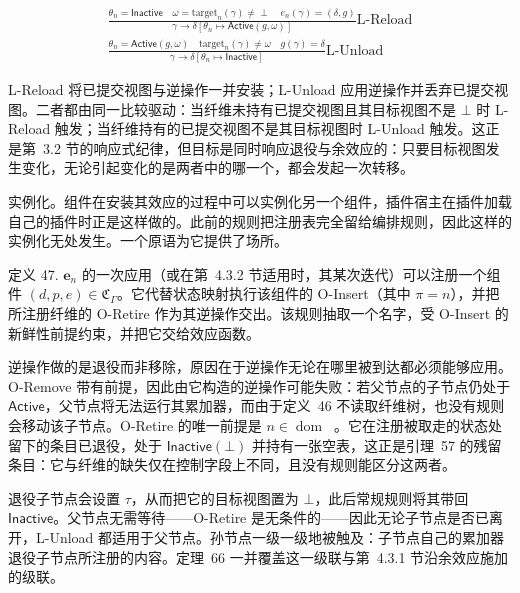 \[
\begin{array} { r }
{ \frac { \theta _ { n } = \mathsf { I n a c t i v e } \quad \omega = \mathrm { t a r g e t } _ { n } ( \gamma ) \neq \perp \quad e _ { n } ( \gamma ) = ( \delta , g ) } { \gamma \longrightarrow \delta [ \theta _ { n } \mapsto \mathsf { A c t i v e } ( g , \omega ) ] } \mathrm { L } \text {-Reload} } \\
{ \frac { \theta _ { n } = \mathsf { A c t i v e } ( g , \omega ) \quad \mathrm { t a r g e t } _ { n } ( \gamma ) \neq \omega \quad g ( \gamma ) = \delta } { \gamma \longrightarrow \delta [ \theta _ { n } \mapsto \mathsf { I n a c t i v e } ] } \mathrm { L } \text {-Unload} }
\end{array}
\]

L-Reload 将已提交视图与逆操作一并安装；L-Unload 应用逆操作并丢弃已提交视图。二者都由同一比较驱动：当纤维未持有已提交视图且其目标视图不是 $\bot$ 时 L-Reload 触发；当纤维持有的已提交视图不是其目标视图时 L-Unload 触发。这正是第~3.2 节的响应式纪律，但目标是同时响应退役与余效应的：只要目标视图发生变化，无论引起变化的是两者中的哪一个，都会发起一次转移。

实例化。组件在安装其效应的过程中可以实例化另一个组件，插件宿主在插件加载自己的插件时正是这样做的。此前的规则把注册表完全留给编排规则，因此这样的实例化无处发生。一个原语为它提供了场所。

定义 47. \(\boldsymbol { e } _ { n }\) 的一次应用（或在第~4.3.2 节适用时，其某次迭代）可以注册一个组件 \(( d , p , e ) \in \mathfrak { C } _ { \Gamma }\)。它代替状态映射执行该组件的 O-Insert（其中 \(\pi = n\)），并把所注册纤维的 O-Retire 作为其逆操作交出。该规则抽取一个名字，受 O-Insert 的新鲜性前提约束，并把它交给效应函数。

逆操作做的是退役而非移除，原因在于逆操作无论在哪里被到达都必须能够应用。O-Remove 带有前提，因此由它构造的逆操作可能失败：若父节点的子节点仍处于 $\mathsf { A c t i v e }$，父节点将无法运行其累加器，而由于定义~46 不读取纤维树，也没有规则会移动该子节点。O-Retire 的唯一前提是 \(n \in \mathop { \mathrm { d o m } } \mathop { \left( F _ { \gamma } \right) }\)。它在注册被取走的状态处留下的条目已退役，处于 \(\mathsf { I n a c t i v e } ( \bot )\) 并持有一张空表，这正是引理~57 的残留条目：它与纤维的缺失仅在控制字段上不同，且没有规则能区分这两者。

退役子节点会设置 \(\tau\)，从而把它的目标视图置为 $\bot$，此后常规规则将其带回 $\mathsf { I n a c t i v e }$。父节点无需等待——O-Retire 是无条件的——因此无论子节点是否已离开，L-Unload 都适用于父节点。孙节点一级一级地被触及：子节点自己的累加器退役子节点所注册的内容。定理~66 一并覆盖这一级联与第~4.3.1 节沿余效应施加的级联。

